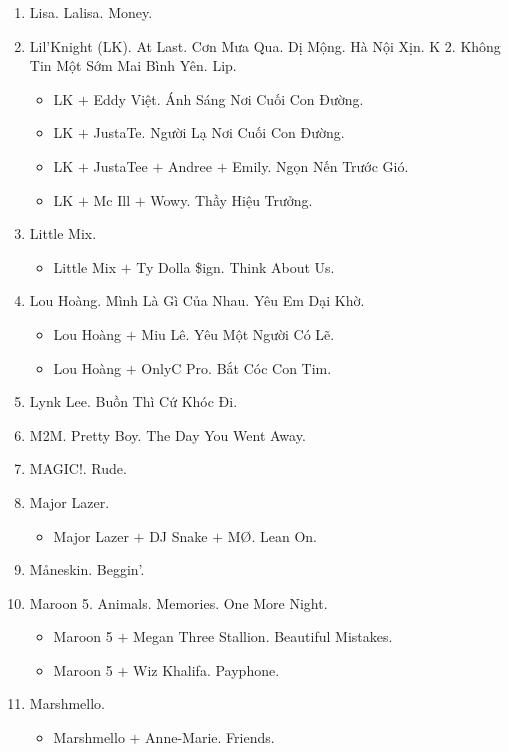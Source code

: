 \documentclass{article}
\begin{document}
\begin{enumerate}
	\item {\sc Lisa.} Lalisa. Money.
	\item {\sc Lil'Knight (LK).} At Last. Cơn Mưa Qua. Dị Mộng. Hà Nội Xịn. K 2. Không Tin Một Sớm Mai Bình Yên. Lip.
	\begin{itemize}
		\item {\sc LK $+$ Eddy Việt.} Ánh Sáng Nơi Cuối Con Đường.
		\item {\sc LK $+$ JustaTe.} Người Lạ Nơi Cuối Con Đường.
		\item {\sc LK $+$ JustaTee $+$ Andree $+$ Emily.} Ngọn Nến Trước Gió.
		\item {\sc LK $+$ Mc Ill $+$ Wowy.} Thầy Hiệu Trưởng.
	\end{itemize}
	\item {\sc Little Mix.}
	\begin{itemize}
		\item {\sc Little Mix $+$ Ty Dolla \$ign.} Think About Us.
	\end{itemize}
	\item {\sc Lou Hoàng.} Mình Là Gì Của Nhau. Yêu Em Dại Khờ.
	\begin{itemize}
		\item {\sc Lou Hoàng $+$ Miu Lê.} Yêu Một Người Có Lẽ.
		\item {\sc Lou Hoàng $+$ OnlyC Pro.} Bắt Cóc Con Tim.
	\end{itemize}
	\item {\sc Lynk Lee.} Buồn Thì Cứ Khóc Đi.
	\item {\sc M2M.} Pretty Boy. The Day You Went Away.
	\item {\sc MAGIC!.} Rude.
	\item {\sc Major Lazer.}
	\begin{itemize}
		\item {\sc Major Lazer $+$ DJ Snake $+$ M\O.} Lean On.
	\end{itemize}
	\item {\sc M\r{a}neskin.} Beggin'.
	\item {\sc Maroon 5.} Animals. Memories. One More Night.
	\begin{itemize}
		\item {\sc Maroon 5 $+$ Megan Three Stallion.} Beautiful Mistakes.
		\item {\sc Maroon 5 $+$ Wiz Khalifa.} Payphone.
	\end{itemize}
	\item {\sc Marshmello.}
	\begin{itemize}
		\item {\sc Marshmello $+$ Anne-Marie.} Friends.

\end{itemize}
\end{enumerate}
\end{document}
